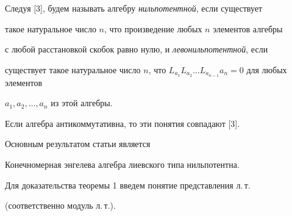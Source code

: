  


Следуя [3], будем называть алгебру {\it нильпотентной}, если существует 


такое натуральное число $n$, что произведение любых $n$ элементов алгебры 


с любой расстановкой скобок равно нулю, и {\it левонильпотентной}, если 


существует такое натуральное число $n$, что $L_{a_1}L_{a_2}\dotsc 


L_{a_{n-1}}a_n=0$ для любых элементов 


$a_1,a_2,\dotsc,a_n$ из этой алгебры.  


 


Если алгебра антикоммутативна, то эти понятия совпадают [3]. 


 


Основным результатом статьи является  


 


 


\begin{thm} 


Конечномерная энгелева алгебра лиевского типа нильпотентна. 


\end{thm} 


 


Для доказательства теоремы 1 введем понятие представления л.\,т. 


(соответственно модуль л.\,т.). 


 


 


